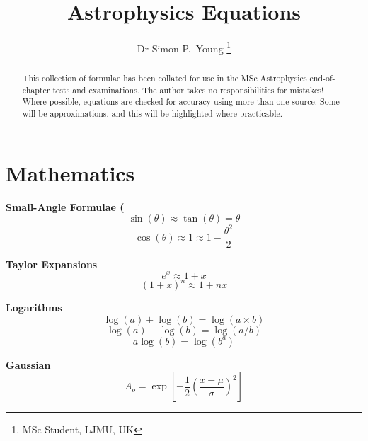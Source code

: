\documentclass{article}
\author{Dr Simon P.~Young \thanks{MSc Student, LJMU, UK}}
\title {Astrophysics Equations}
\begin{document}
\maketitle


\begin{abstract}
This collection of formulae has been collated for use in the MSc Astrophysics end-of-chapter tests and examinations. The author takes no responsibilities for mistakes! Where possible, equations are checked for accuracy using more than one source. Some will be approximations, and this will be highlighted where practicable. 

\end{abstract}

\tableofcontents

\newpage

\section{Mathematics}

\textbf{Small-Angle Formulae (}
\begin{equation}
\sin(\theta) \approx \tan(\theta) = \theta
\end{equation}
\begin{equation}
\cos(\theta) \approx 1 \approx 1 - \frac {\theta^2} {2}
\end{equation}

\textbf{Taylor Expansions}
\begin{equation}
e^x \approx 1 + x
\end{equation}
\begin{equation}
\left(1 + x\right)^n \approx 1 + nx
\end{equation}

\textbf{Logarithms}
\begin{equation}
\log(a) + \log(b) = \log(a \times b)
\end{equation}
\begin{equation}
\log(a) - \log(b) = \log(a/b)
\end{equation}
\begin{equation}
a \log(b) = \log(b^a)
\end{equation}

\textbf {Gaussian}
\begin{equation}
A_o = \exp \left[ - \frac {1}{2} \left( \frac {x - \mu}{\sigma} \right)^2 \right]
\end{equation}
\end{document}
